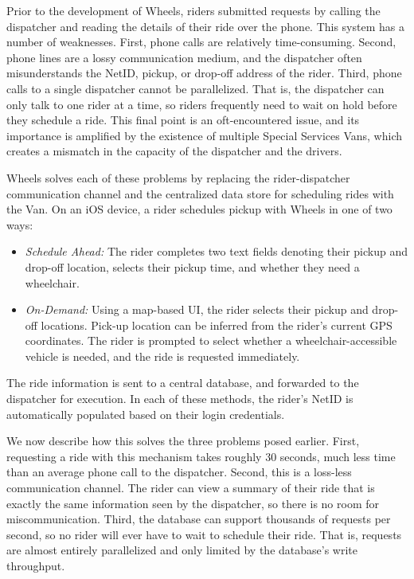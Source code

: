 \documentclass[12pt, a4paper]{article}
\begin{document}
\begin{multicols*}{2}
Prior to the development of Wheels, riders submitted requests by calling the dispatcher and reading the details of their ride over the phone. This system has a number of weaknesses. First, phone calls are relatively time-consuming. Second, phone lines are a lossy communication medium, and the dispatcher often misunderstands the NetID, pickup, or drop-off address of the rider. Third, phone calls to a single dispatcher cannot be parallelized. That is, the dispatcher can only talk to one rider at a time, so riders frequently need to wait on hold before they schedule a ride. This final point is an oft-encountered issue, and its importance is amplified by the existence of multiple Special Services Vans, which creates a mismatch in the capacity of the dispatcher and the drivers.

Wheels solves each of these problems by replacing the rider-dispatcher communication channel and the centralized data store for scheduling rides with the Van. On an iOS device, a rider schedules pickup with Wheels in one of two ways:
\begin{itemize}
	\item \textit{Schedule Ahead:} The rider completes two text fields denoting their pickup and drop-off location, selects their pickup time, and whether they need a wheelchair.
	\item \textit{On-Demand:} Using a map-based UI, the rider selects their pickup and drop-off locations. Pick-up location can be inferred from the rider's current GPS coordinates. The rider is prompted to select whether a wheelchair-accessible vehicle is needed, and the ride is requested immediately.
\end{itemize}
The ride information is sent to a central database, and forwarded to the dispatcher for execution. In each of these methods, the rider's NetID is automatically populated based on their login credentials.

We now describe how this solves the three problems posed earlier. First, requesting a ride with this mechanism takes roughly 30 seconds, much less time than an average phone call to the dispatcher. Second, this is a loss-less communication channel. The rider can view a summary of their ride that is exactly the same information seen by the dispatcher, so there is no room for miscommunication. Third, the database can support thousands of requests per second, so no rider will ever have to wait to schedule their ride. That is, requests are almost entirely parallelized and only limited by the database's write throughput.


\end{multicols*}
\end{document}
